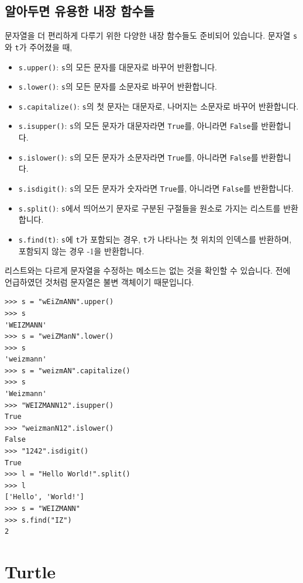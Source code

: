 \documentclass[../main.tex]{subfiles}
\begin{document}
\subsection{알아두면 유용한 내장 함수들}
문자열을 더 편리하게 다루기 위한 다양한 내장 함수들도 준비되어 있습니다.
문자열 \texttt{s}와 \texttt{t}가 주어졌을 때,
\begin{itemize}
\item \texttt{s.upper()}: \texttt{s}의 모든 문자를 대문자로 바꾸어 반환합니다.
\item \texttt{s.lower()}: \texttt{s}의 모든 문자를 소문자로 바꾸어 반환합니다.
\item \texttt{s.capitalize()}: \texttt{s}의 첫 문자는 대문자로, 나머지는 소문자로 바꾸어 반환합니다.
\item \texttt{s.isupper()}: \texttt{s}의 모든 문자가 대문자라면 \texttt{True}를, 아니라면 \texttt{False}를 반환합니다.
\item \texttt{s.islower()}: \texttt{s}의 모든 문자가 소문자라면 \texttt{True}를, 아니라면 \texttt{False}를 반환합니다.
\item \texttt{s.isdigit()}: \texttt{s}의 모든 문자가 숫자라면 \texttt{True}를, 아니라면 \texttt{False}를 반환합니다.
\item \texttt{s.split()}: \texttt{s}에서 띄어쓰기 문자로 구분된 구절들을 원소로 가지는 리스트를 반환합니다.
\item \texttt{s.find(t)}: \texttt{s}에 \texttt{t}가 포함되는 경우, \texttt{t}가 나타나는 첫 위치의 인덱스를 반환하며, 포함되지 않는 경우 -1을 반환합니다.
\end{itemize}
리스트와는 다르게 문자열을 수정하는 메소드는 없는 것을 확인할 수 있습니다.
전에 언급하였던 것처럼 문자열은 불변 객체이기 때문입니다.
\begin{verbatim}
>>> s = "wEiZmANN".upper()
>>> s
'WEIZMANN'
>>> s = "weiZManN".lower()
>>> s
'weizmann'
>>> s = "weizmAN".capitalize()
>>> s
'Weizmann'
>>> "WEIZMANN12".isupper()
True
>>> "weizmanN12".islower()
False
>>> "1242".isdigit()
True
>>> l = "Hello World!".split()
>>> l
['Hello', 'World!']
>>> s = "WEIZMANN"
>>> s.find("IZ")
2
\end{verbatim}

\section{Turtle}
\end{document}
